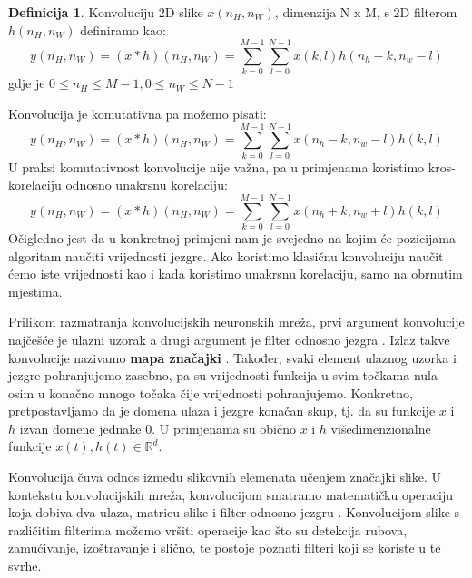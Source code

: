 \documentclass[times, utf8, diplomski]{fer}
\theoremstyle{definition}
\newtheorem{definition}{Definicija}[section]
\begin{document}
\begin{definition}
Konvoluciju 2D slike $x(n_H, n_W)$, dimenzija N x M, s 2D filterom $h(n_H, n_W)$ definiramo kao:
\begin{equation}
y(n_H, n_W) = (x * h) (n_H, n_W) = \sum_{k = 0 }^{M-1}\sum_{l=0}^{N-1}x(k,l)h(n_h-k, n_w-l)
\end{equation}
gdje je $0\le n_H \le M-1, 0\le n_W \le N - 1$
\end{definition}
Konvolucija je komutativna pa možemo pisati:
\begin{equation}
y(n_H, n_W) = (x * h) (n_H, n_W) = \sum_{k = 0 }^{M-1}\sum_{l=0}^{N-1}x(n_h -k, n_w - l)h(k, l)
\end{equation}
U praksi komutativnost konvolucije nije važna, pa u primjenama koristimo kros-korelaciju  odnosno unakrsnu korelaciju:
\begin{equation}
y(n_H, n_W) = (x * h) (n_H, n_W) = \sum_{k = 0 }^{M-1}\sum_{l=0}^{N-1}x(n_h + k, n_w + l)h(k, l)
\end{equation}
Očigledno jest da u konkretnoj primjeni nam je svejedno na kojim će pozicijama algoritam naučiti vrijednosti jezgre. Ako koristimo klasičnu konvoluciju naučit ćemo iste vrijednosti kao i kada koristimo unakrsnu korelaciju, samo na obrnutim mjestima.

Prilikom razmatranja konvolucijskih neuronskih mreža, prvi argument konvolucije najčešće je ulazni uzorak a drugi argument je filter odnosno jezgra . Izlaz takve konvolucije nazivamo \textbf{mapa značajki} . Također, svaki element ulaznog uzorka i jezgre pohranjujemo zasebno, pa su vrijednosti funkcija u svim točkama nula osim u konačno mnogo točaka čije vrijednosti pohranjujemo. Konkretno, pretpostavljamo da je domena ulaza i jezgre konačan skup, tj. da su funkcije $x$ i $h$ izvan domene jednake 0. U primjenama su obično $x$ i $h$ višedimenzionalne funkcije $x(t), h(t) \in \mathbb{R}^d. $

Konvolucija čuva odnos između slikovnih elemenata učenjem značajki slike. U kontekstu konvolucijskih mreža, konvolucijom smatramo matematičku operaciju koja dobiva dva ulaza, matricu slike i filter odnosno jezgru . Konvolucijom slike s različitim filterima možemo vršiti operacije kao što su detekcija rubova, zamućivanje, izoštravanje i slično, te postoje poznati filteri koji se koriste u te svrhe.
\end{document}
